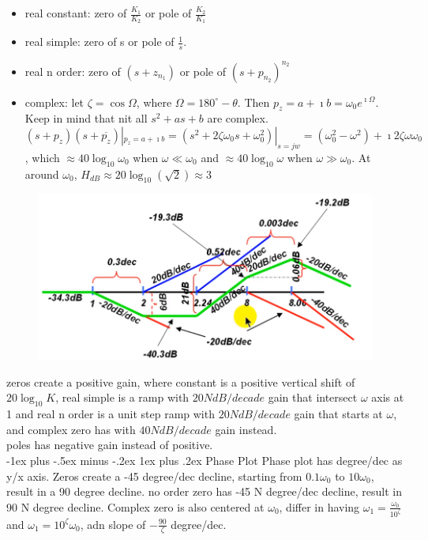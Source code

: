 \documentclass[10pt,landscape]{article}
\makeatletter
\renewcommand{\subsubsection}{\@startsection{subsubsection}{3}{0mm}%
                                {-1ex plus -.5ex minus -.2ex}%
                                {1ex plus .2ex}%
                                {\normalfont\small\bfseries}}
\theoremstyle{definition}
\theoremstyle{remark}
\makeatother
\begin{document}
\begin{multicols}{3}
\begin{itemize}[noitemsep,nolistsep]
    \item real constant: zero of $\frac{K_1}{K_2}$ or pole of $\frac{K_2}{K_1}$
    \item real simple: zero of s or pole of $\frac{1}{s}$. 
    \item real n order: zero of $(s+z_{n_1})$ or pole of $(s+p_{n_2})^{n_2}$
    \item complex: let $\zeta = \cos\Omega$, where $\Omega= 180^{\circ} - \theta$. Then $p_z = a + \imath b = \omega_0 e^{\imath\Omega}$. Keep in mind that nit all $s^2 + as + b$ are complex.  \\
    $(s + p_z)(s + \overline{p_z})|_{p_z = a + \imath b} = (s^2 + 2\zeta \omega_0 s + \omega_0^2)|_{s=jw} = (\omega_0^2 - \omega^2) + \imath 2 \zeta \omega\omega_0$, which $\approx 40\log_10\omega_0$ when $\omega \ll \omega_0$ and  $\approx 40\log_10\omega$ when $\omega \gg \omega_0$. At around $\omega_0$, $H_{dB} \approx 20\log_{10}(\sqrt{2}) \approx 3$
\end{itemize}

\begin{figure}[H]
    \centering
    \includegraphics[width=\linewidth]{202/figure/bode_1.png}
    \caption{}
    \label{fig:bode_1}
\end{figure}
zeros create a positive gain, where constant is a positive vertical shift of $20\log_{10}K$, real simple is a ramp with $20N dB/decade$ gain that intersect $\omega$ axis at 1 and real n order is a unit step ramp with $20N dB/decade$ gain that starts at $\omega$, and complex zero has with $40N dB/decade$ gain instead.  \\
poles has negative gain instead of positive. \\


\subsubsection{Phase Plot}
Phase plot has degree/dec as y/x axis.
Zeros create a -45 degree/dec decline, starting from $0.1\omega_0$ to $10\omega_0$, result in a 90 degree decline. no order zero has -45 N degree/dec decline, result in 90 N degree decline. Complex zero is also centered at $\omega_0$, differ in having $\omega_1 = \frac{\omega_0}{10^{\zeta}}$ and $\omega_1 =10^{\zeta} \omega_0$, adn slope of $-\frac{90}{\zeta}$ degree/dec.


\end{multicols}
\end{document}
